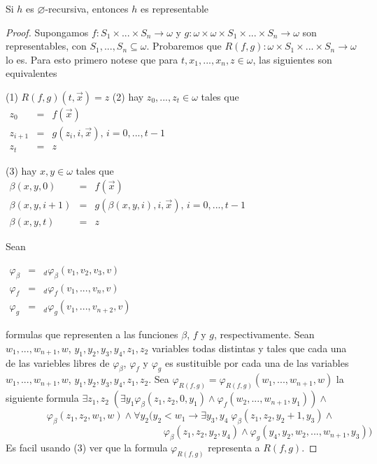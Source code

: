   \begin{proposition}
    Si \(h\) es \(\varnothing \)-recursiva, entonces \(h\) es representable
  \end{proposition}
  \begin{proof}
    Supongamos \(f:S_{1}\times ...\times S_{n}\rightarrow \omega \) y \(g:\omega \times \omega \times S_{1}\times ...\times S_{n}\rightarrow \omega \) son representables, con \(S_{1},...,S_{n}\subseteq \omega \). Probaremos que \( R(f,g):\omega \times S_{1}\times ...\times S_{n}\rightarrow \omega \) lo es. Para esto primero notese que para \(t,x_{1},...,x_{n},z\in \omega \), las siguientes son equivalentes

    (1) \(R(f,g)(t,\vec{x})=z\)
    (2) hay \(z_{0},...,z_{t}\in \omega \) tales que
    \(\displaystyle \begin{array}{rcl} z_{0} & =& f(\vec{x}) \\ z_{i+1} & =& g(z_{i},i,\vec{x})\text{, }i=0,...,t-1 \\ z_{t} & =& z \end{array} \)

    (3) hay \(x,y\in \omega \) tales que
    \(\displaystyle \begin{array}{rcl} \beta (x,y,0) & =& f(\vec{x}) \\ \beta (x,y,i+1) & =& g(\beta (x,y,i),i,\vec{x})\text{, }i=0,...,t-1 \\ \beta (x,y,t) & =& z \end{array} \)

    Sean

    \(\displaystyle \begin{array}{rcl} \varphi _{\beta } & =& _{d}\varphi _{\beta }(v_{1},v_{2},v_{3},v) \\ \varphi _{f} & =& _{d}\varphi _{f}(v_{1},...,v_{n},v) \\ \varphi _{g} & =& _{d}\varphi _{g}(v_{1},...,v_{n+2},v) \end{array} \)

    formulas que representen a las funciones \(\beta \), \(f\) y \(g\), respectivamente. Sean \(w_{1},...,w_{n+1},w\), \( y_{1},y_{2},y_{3},y_{4},z_{1},z_{2}\) variables todas distintas y tales que cada una de las variebles libres de \(\varphi _{\beta }\), \(\varphi _{f}\) y \( \varphi _{g}\) es sustituible por cada una de las variables \( w_{1},...,w_{n+1},w\), \(y_{1},y_{2},y_{3},y_{4},z_{1},z_{2}\). Sea \(\varphi _{R(f,g)}=\varphi _{R(f,g)}(w_{1},...,w_{n+1},w)\) la siguiente formula
    \(\exists z_{1},z_{2}\;(\exists y_{1}\varphi _{\beta }(z_{1},z_{2},0,y_{1})\wedge \varphi _{f}(w_{2},...,w_{n+1},y_{1}))\wedge \)
    \(\ \ \ \ \ \ \ \ \ \ \ \ \ \ \ \ \ \ \ \varphi _{\beta }(z_{1},z_{2},w_{1},w)\wedge \forall y_{2}(y_{2}< w_{1}\rightarrow \exists y_{3},y_{4}\;\varphi _{\beta }(z_{1},z_{2},y_{2}+1,y_{3})\wedge \)
    \(\ \ \ \ \ \ \ \ \ \ \ \ \ \ \ \ \ \ \ \ \ \ \ \ \ \ \ \ \ \ \ \ \ \ \ \ \ \ \ \ \ \ \ \ \ \ \ \ \ \ \ \ \ \ \ \ \ \ \ \ \ \ \ \ \ \ \ \ \ \ \ \ \ \varphi _{\beta }(z_{1},z_{2},y_{2},y_{4})\wedge \varphi _{g}(y_{4},y_{2},w_{2},...,w_{n+1},y_{3}))\)
    Es facil usando (3) ver que la formula \(\varphi _{R(f,g)}\) representa a \(R(f,g)\).


\end{proof}
